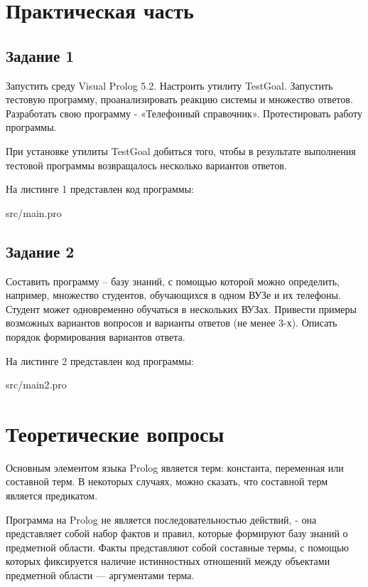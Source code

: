 \chapter*{Практическая часть}

\section*{Задание 1}
Запустить среду Visual Prolog 5.2. Настроить утилиту TestGoal. 
Запустить тестовую программу, проанализировать реакцию системы и множество ответов. 
Разработать свою программу - «Телефонный справочник». 
Протестировать работу программы.

При установке утилиты TestGoal добиться того, чтобы в результате выполнения
тестовой программы возвращалось несколько вариантов ответов.

На листинге 1 представлен код программы:

\FloatBarrier
\begin{lstinputlisting}[style={lsp}]{src/main.pro}
\end{lstinputlisting}
\FloatBarrier

\section*{Задание 2}
Составить программу – базу знаний, с помощью которой можно определить, например,
множество студентов, обучающихся в одном ВУЗе и их телефоны. Студент может
одновременно обучаться в нескольких ВУЗах. Привести примеры возможных вариантов
вопросов и варианты ответов (не менее 3-х). Описать порядок формирования вариантов
ответа.

На листинге 2 представлен код программы:
\FloatBarrier
\begin{lstinputlisting}[style={lsp}]{src/main2.pro}
\end{lstinputlisting}
\FloatBarrier

\chapter*{Теоретические вопросы}
Основным элементом языка Prolog является терм: константа, переменная или составной терм. 
В некоторых случаях, можно сказать, что составной терм является предикатом.

Программа на Prolog не является последовательностью действий, - она представляет
собой набор фактов и правил, которые формируют базу знаний о предметной области. 
Факты представляют собой составные термы, с помощью которых фиксируется наличие
истинностных отношений между объектами предметной области — аргументами терма.

